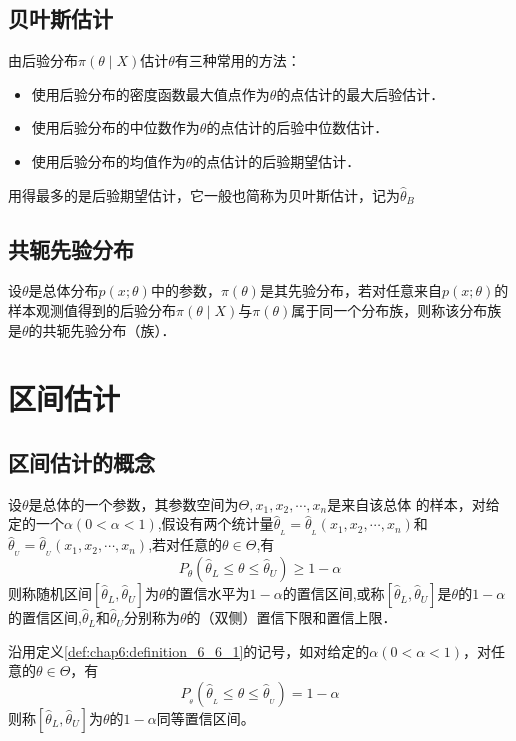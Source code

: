 \subsection{贝叶斯估计}
由后验分布$\pi(\theta\mid X)$估计$\theta$有三种常用的方法：
\begin{itemize}
    \item 使用后验分布的密度函数最大值点作为$\theta$的点估计的最大后验估计．
    \item 使用后验分布的中位数作为$\theta$的点估计的后验中位数估计．
    \item 使用后验分布的均值作为$\theta$的点估计的后验期望估计．
\end{itemize}
用得最多的是后验期望估计，它一般也简称为贝叶斯估计，记为$\hat{\theta}_{B}$
\subsection{共轭先验分布}
\begin{definition}
    设$\theta$是总体分布$p(x;\theta)$中的参数，$\pi(\theta)$是其先验分布，若对任意来自$p(x;\theta)$的样本观测值得到的后验分布$\pi(\theta\mid X)$与$\pi(\theta)$属于同一个分布族，则称该分布族是$\theta$的共轭先验分布（族）．
\end{definition}

\section{区间估计}
\subsection{区间估计的概念}
\begin{definition}
    \label{def:chap6:definition_6_6_1}
    设$\theta$是总体的一个参数，其参数空间为$\Theta,x_{1},x_{2},\cdots,x_{n}$是来自该总体
    的样本，对给定的一个$\alpha(0<\alpha<1)$,假设有两个统计量$\hat{\theta}_{_L}=\hat{\theta}_{_L}(x_1,x_2,\cdots,x_n)$和$\hat{\theta}_{_U}=\hat{\theta}_{_U}(x_1,x_2,\cdots,x_n)$,若对任意的$\theta \in \Theta$,有
    \begin{equation}
        P_\theta(\hat{\theta}_L\leqslant\theta\leqslant\hat{\theta}_U)\geqslant1-\alpha
    \end{equation}
    则称随机区间$[\hat{\theta}_{L},\hat{\theta}_{U}]$为$\theta$的置信水平为$1-\alpha$的置信区间,或称$[\hat{\theta}_{L},\hat{\theta}_{U}]$是$\theta$的$1-\alpha$的置信区间,$\hat{\theta}_{L}$和$\hat{\theta}_{U}$分别称为$\theta$的（双侧）置信下限和置信上限．
\end{definition}
\begin{definition}
    沿用定义\ref{def:chap6:definition_6_6_1}的记号，如对给定的$\alpha (0<\alpha<1 )$，对任意的$\theta \in  \Theta$，有
    \begin{equation}
        P_{_\theta}(\hat{\theta}_{_L}\leqslant\theta\leqslant\hat{\theta}_{_U})=1-\alpha
    \end{equation}
    则称$[\hat{\theta}_{L},\hat{\theta}_{U}]$为$\theta$的$1-\alpha $同等置信区间。

\end{definition}

